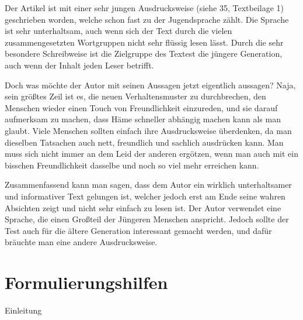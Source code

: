 Der Artikel ist mit einer sehr jungen Ausdrucksweise (siehe 35, Textbeilage 1) geschrieben worden, welche schon fast zu der Jugendsprache zählt. Die Sprache ist sehr unterhaltsam, auch wenn sich der Text durch die vielen zusammengesetzten Wortgruppen nicht sehr flüssig lesen lässt. Durch die sehr besondere Schreibweise ist die Zielgruppe des Textest die jüngere Generation, auch wenn der Inhalt jeden Leser betrifft. 

Doch was möchte der Autor mit seinen Aussagen jetzt eigentlich aussagen? Naja, sein größtes Zeil ist es, die neuen Verhaltensmuster zu durchbrechen, den Menschen wieder einen Touch von Freundlichkeit einzureden, und sie darauf aufmerksam zu machen, dass Häme schneller abhängig machen kann als man glaubt. Viele Menschen sollten einfach ihre Ausdrucksweise überdenken, da man dieselben Tatsachen auch nett, freundlich und sachlich ausdrücken kann. Man muss sich nicht immer an dem Leid der anderen ergötzen, wenn man auch mit ein bisschen Freundlichkeit dasselbe und noch so viel mehr erreichen kann. 

Zusammenfassend kann man sagen, dass dem Autor ein wirklich unterhaltsamer und informativer Text gelungen ist, welcher jedoch erst am Ende seine wahren Absichten zeigt und nicht sehr einfach zu lesen ist. Der Autor verwendet eine Sprache, die einen Großteil der Jüngeren Menschen anspricht. Jedoch sollte der Test auch für die ältere Generation interessant gemacht werden, und dafür bräuchte man eine andere Ausdrucksweise.

\newpage

\section{Formulierungshilfen}
Einleitung

